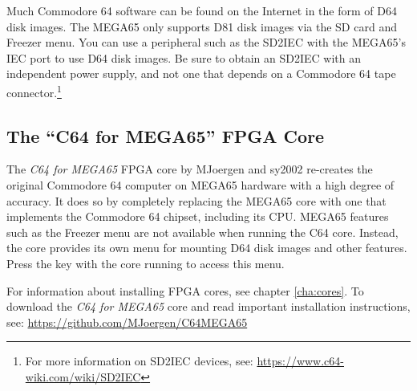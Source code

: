 Much Commodore 64 software can be found on the Internet in the form of D64 disk images. The MEGA65 only supports D81 disk images via the SD card and Freezer menu. You can use a peripheral such as the SD2IEC with the MEGA65's IEC port to use D64 disk images. Be sure to obtain an SD2IEC with an independent power supply, and not one that depends on a Commodore 64 tape connector.\footnote{For more information on SD2IEC devices, see: \url{https://www.c64-wiki.com/wiki/SD2IEC}}

\subsection{The ``C64 for MEGA65'' FPGA Core}

The {\it C64 for MEGA65} FPGA core by MJoergen and sy2002 re-creates the original Commodore 64 computer on MEGA65 hardware with a high degree of accuracy. It does so by completely replacing the MEGA65 core with one that implements the Commodore 64 chipset, including its CPU. MEGA65 features such as the Freezer menu are not available when running the C64 core. Instead, the core provides its own menu for mounting D64 disk images and other features. Press the  key with the core running to access this menu.


For information about installing FPGA cores, see chapter \vref{cha:cores}. To download the {\it C64 for MEGA65} core and read important installation instructions, see: \url{https://github.com/MJoergen/C64MEGA65}
